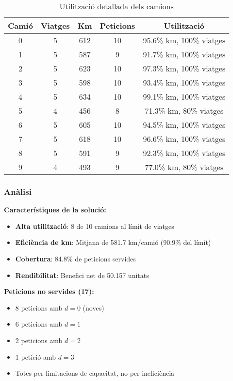 \begin{table}[H]
\centering
\small
\begin{tabular}{@{}ccccc@{}}
\toprule
\textbf{Camió} & \textbf{Viatges} & \textbf{Km} & \textbf{Peticions} & \textbf{Utilització} \\
\midrule
0 & 5 & 612 & 10 & 95.6\% km, 100\% viatges \\
1 & 5 & 587 & 9 & 91.7\% km, 100\% viatges \\
2 & 5 & 623 & 10 & 97.3\% km, 100\% viatges \\
3 & 5 & 598 & 10 & 93.4\% km, 100\% viatges \\
4 & 5 & 634 & 10 & 99.1\% km, 100\% viatges \\
5 & 4 & 456 & 8 & 71.3\% km, 80\% viatges \\
6 & 5 & 605 & 10 & 94.5\% km, 100\% viatges \\
7 & 5 & 618 & 10 & 96.6\% km, 100\% viatges \\
8 & 5 & 591 & 9 & 92.3\% km, 100\% viatges \\
9 & 4 & 493 & 9 & 77.0\% km, 80\% viatges \\
\bottomrule
\end{tabular}
\caption{Utilització detallada dels camions}
\label{tab:exp8-camions}
\end{table}

\subsubsection{Anàlisi}

\textbf{Característiques de la solució:}
\begin{itemize}
    \item \textbf{Alta utilització}: 8 de 10 camions al límit de viatges
    \item \textbf{Eficiència de km}: Mitjana de 581.7 km/camió (90.9\% del límit)
    \item \textbf{Cobertura}: 84.8\% de peticions servides
    \item \textbf{Rendibilitat}: Benefici net de 50.157 unitats
\end{itemize}

\textbf{Peticions no servides (17):}
\begin{itemize}
    \item 8 peticions amb $d=0$ (noves)
    \item 6 peticions amb $d=1$ 
    \item 2 peticions amb $d=2$
    \item 1 petició amb $d=3$
    \item Totes per limitacions de capacitat, no per ineficiència
\end{itemize}

